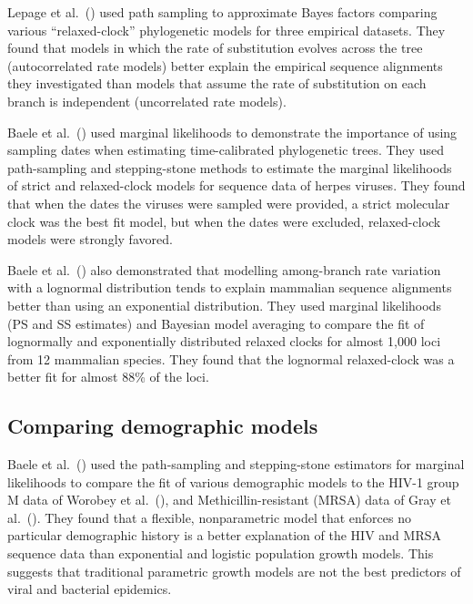 Lepage et al.\ (\citeyear{Lepage2007}) used path sampling to approximate Bayes
factors comparing various ``relaxed-clock'' phylogenetic models for
three empirical datasets.
They found that models in which the rate of substitution evolves across the tree
(autocorrelated rate models) better explain the empirical sequence alignments
they investigated than models that assume the rate of substitution on each
branch is independent (uncorrelated rate models).

Baele et al.\ (\citeyear{Baele2012}) used marginal likelihoods to demonstrate
the importance of using sampling dates when estimating time-calibrated
phylogenetic trees.
They used path-sampling and stepping-stone methods to estimate the marginal
likelihoods of strict and relaxed-clock models for sequence data of herpes
viruses.
They found that when the dates the viruses were sampled were provided, a strict
molecular clock was the best fit model, but when the dates were excluded,
relaxed-clock models were strongly favored.

Baele et al.\ (\citeyear{Baele2012}) also demonstrated that modelling
among-branch rate variation with a lognormal distribution tends to explain
mammalian sequence alignments better than using an exponential distribution.
They used marginal likelihoods (PS and SS estimates) and Bayesian model
averaging to compare the fit of lognormally and exponentially distributed
relaxed clocks for almost 1,000 loci from 12 mammalian species.
They found that the lognormal relaxed-clock was a better fit for almost 88\% of
the loci.

\subsection{Comparing demographic models}

Baele et al.\ (\citeyear{Baele2012}) used the path-sampling and stepping-stone
estimators for marginal likelihoods to compare the fit of various demographic
models to the HIV-1 group M data of Worobey et al.\ (\citeyear{Worobey2008}),
and Methicillin-resistant  (MRSA)  data of Gray et
al.\ (\citeyear{Gray2011}).
They found that a flexible, nonparametric model that enforces no particular
demographic history is a better explanation of the HIV and MRSA sequence data
than exponential and logistic population growth models.
This suggests that traditional parametric growth models are not the best
predictors of viral and bacterial epidemics.



